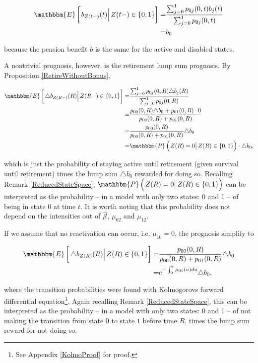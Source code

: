 \documentclass{article}
\newcommand{\1}[1]{\mathbbm{1}_{\left\lbrace #1 \right\rbrace}}
\newcommand{\econd}[2][def]{\mathbbm{E} \left[ \left. #1 \right| #2 \right]}
\newcommand{\pcond}[2][def]{\mathbbm{P} \left( \left. #1 \right| #2 \right)}
\theoremstyle{break}
\theoremstyle{remark}
\numberwithin{equation}{section}
\begin{document}
\begin{align*}
    \econd[b_{Z(t-)} (t)]{Z(t-) \in \{ 0,1 \}} =& \frac{\sum_{j = 0}^1 p_{0j}(0,t) b_j(t)}{\sum_{j = 0}^1 p_{0j}(0,t)} \\
    =& b_0
\end{align*}

because the pension benefit $b$ is the same for the active and disabled states.

A nontrivial prognosis, however, is the retirement lump sum prognosis. By Proposition \ref{RetireWithoutBonus},

\begin{align*}
    \econd[\triangle b_{Z(R-)} (R)]{Z(R-) \in \{ 0,1 \}} =& \frac{\sum_{j = 0}^1 p_{0j}(0,R) \triangle b_j(R)}{\sum_{j = 0}^1 p_{0j}(0,R)} \\
    =&\frac{p_{00}(0,R) \triangle b_0 + p_{01}(0,R) \cdot 0}{p_{00}(0,R) + p_{01}(0,R)} \\
    =& \frac{p_{00}(0,R)}{p_{00}(0,R) + p_{01}(0,R)} \triangle b_0 \\
    =& \pcond[Z(R) = 0]{Z(R) \in \{ 0,1 \}} \cdot \triangle b_0,
\end{align*}
    
which is just the probability of staying active until retirement (given survival until retirement) times the lump sum $\triangle b_0$ rewarded for doing so. Recalling Remark \ref{ReducedStateSpace}, $\pcond[Z(R) = 0]{Z(R) \in \{ 0,1 \}}$ can be interpreted as the probability -- in a model with only two states: 0 and 1 -- of being in state 0 at time $t$. It is worth noting that this probability does not depend on the intensities out of $\hat{\mathcal{J}}$, $\mu_{02}$ and $\mu_{12}$.

If we assume that no reactivation can occur, i.e. $\mu_{10}=0$, the prognosis simplify to

\begin{align*}
\econd[\triangle b_{Z(R)} (R)]{Z(R) \in \{ 0,1 \}} =& \frac{p_{00}(0,R)}{p_{00}(0,R) + p_{01}(0,R)} \triangle b_0 \\
=& e^{-\int_0^t \mu_{01}(u)du} \triangle b_0,
\end{align*}

where the transition probabilities were found with Kolmogorovs forward differential equation\footnote{See Appendix \ref{KolmoProof} for proof.}. Again recalling Remark \ref{ReducedStateSpace}, this can be interpreted as the probability -- in a model with only two states: 0 and 1 -- of not making the transition from state $0$ to state $1$ before time $R$, times the lump sum reward for not doing so.
\end{document}
